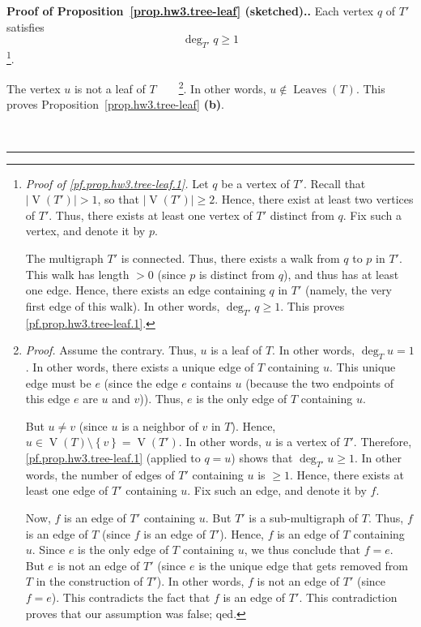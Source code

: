 \documentclass[numbers=enddot,12pt,final,onecolumn,notitlepage]{scrartcl}%
\theoremstyle{definition}
\newenvironment{proof}[1][Proof]{\noindent\textbf{#1.} }{\ \rule{0.5em}{0.5em}}
\newcommand{\set}[1]{\left\{ #1 \right\}}
\newcommand{\abs}[1]{\left| #1 \right|}
\newcommand{\verts}[1]{\operatorname{V}\left( #1 \right)}
\newcommand{\leaves}[1]{\operatorname{Leaves}\left( #1 \right)}
\begin{document}
{\begin{proof}[Proof of Proposition~\ref{prop.hw3.tree-leaf}
(sketched).]
Each vertex $q$ of $T'$ satisfies
\begin{equation}
\deg_{T'} q \geq 1
\label{pf.prop.hw3.tree-leaf.1}
\end{equation}
\footnote{\textit{Proof of \eqref{pf.prop.hw3.tree-leaf.1}.}
  Let $q$ be a vertex of $T'$.
  Recall that $\abs{\verts{T'}} > 1$, so that
  $\abs{\verts{T'}} \geq 2$.
  Hence, there exist at least two vertices of $T'$.
  Thus, there exists at least one vertex of $T'$ distinct from $q$.
  Fix such a vertex, and denote it by $p$.
  \par
  The multigraph $T'$ is connected.
  Thus, there exists a walk from $q$ to $p$ in $T'$.
  This walk has length $> 0$ (since $p$ is distinct from $q$), and
  thus has at least one edge.
  Hence, there exists an edge containing $q$ in $T'$
  (namely, the very first edge of this walk).
  In other words, $\deg_{T'} q \geq 1$.
  This proves \eqref{pf.prop.hw3.tree-leaf.1}.
}.

The vertex $u$ is not a leaf of $T$\ \ \ \ \footnote{\textit{Proof.}
  Assume the contrary.
  Thus, $u$ is a leaf of $T$.
  In other words, $\deg_T u = 1$.
  In other words, there exists a unique edge of $T$ containing $u$.
  This unique edge must be $e$ (since the edge $e$ contains $u$
  (because the two endpoints of this edge $e$ are $u$ and $v$)).
  Thus, $e$ is the only edge of $T$ containing $u$.
  \par
  But $u \neq v$ (since $u$ is a neighbor of $v$ in $T$).
  Hence, $u \in \verts{T} \setminus \set{v} = \verts{T'}$.
  In other words, $u$ is a vertex of $T'$.
  Therefore, \eqref{pf.prop.hw3.tree-leaf.1} (applied to $q = u$)
  shows that $\deg_{T'} u \geq 1$.
  In other words, the number of edges of $T'$ containing $u$ is
  $\geq 1$.
  Hence, there exists at least one edge of $T'$ containing $u$.
  Fix such an edge, and denote it by $f$.
  \par
  Now, $f$ is an edge of $T'$ containing $u$.
  But $T'$ is a sub-multigraph of $T$.
  Thus, $f$ is an edge of $T$ (since $f$ is an edge of $T'$).
  Hence, $f$ is an edge of $T$ containing $u$.
  Since $e$ is the only edge of $T$ containing $u$,
  we thus conclude that $f = e$.
  But $e$ is not an edge of $T'$ (since $e$ is the unique edge that
  gets removed from $T$ in the construction of $T'$).
  In other words, $f$ is not an edge of $T'$ (since $f = e$).
  This contradicts the fact that $f$ is an edge of $T'$.
  This contradiction proves that our assumption was false; qed.
}.
In other words, $u \notin \leaves{T}$.
This proves Proposition~\ref{prop.hw3.tree-leaf} \textbf{(b)}.


\end{proof}}
\end{document}
